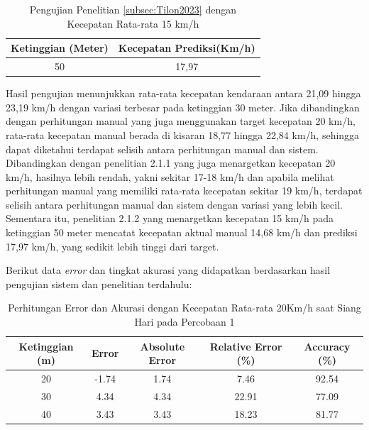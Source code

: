 \vspace{-10pt}
\begin{table}[H]
	\caption{Pengujian Penelitian \ref{subsec:Tilon2023} dengan Kecepatan Rata-rata 15 km/h}
    \label{table:15kmh-sistem-Tilon}
	\centering
	\begin{tabular}{|c|c|}
		\hline
		\textbf{Ketinggian (Meter)} & \textbf{Kecepatan Prediksi(Km/h)} \\ \hline
		50 & 17,97 \\ \hline
	\end{tabular}
\end{table}

Hasil pengujian menunjukkan rata-rata kecepatan kendaraan antara 21,09 hingga 23,19 km/h dengan variasi terbesar pada ketinggian 30 meter. Jika dibandingkan dengan perhitungan manual yang juga menggunakan target kecepatan 20 km/h, rata-rata kecepatan manual berada di kisaran 18,77 hingga 22,84 km/h, sehingga dapat diketahui terdapat selisih antara perhitungan manual dan sistem. Dibandingkan dengan penelitian 2.1.1 yang juga menargetkan kecepatan 20 km/h, hasilnya lebih rendah, yakni sekitar 17-18 km/h dan apabila melihat perhitungan manual yang memiliki rata-rata kecepatan sekitar 19 km/h, terdapat selisih antara perhitungan manual dan sistem dengan variasi yang lebih kecil. Sementara itu, penelitian 2.1.2 yang menargetkan kecepatan 15 km/h pada ketinggian 50 meter mencatat kecepatan aktual manual 14,68 km/h dan prediksi 17,97 km/h, yang sedikit lebih tinggi dari target.

Berikut data \emph{error} dan tingkat akurasi yang didapatkan berdasarkan hasil pengujian sistem dan penelitian terdahulu:

\begin{table}[H]
\centering
\caption{Perhitungan Error dan Akurasi dengan Kecepatan Rata-rata 20Km/h saat Siang Hari pada Percobaan 1}
\label{table:error_accuracy_titik1}
\begin{tabular}{|c|c|c|c|c|}
\hline
\textbf{Ketinggian (m)} & \textbf{Error} & \textbf{Absolute Error} & \textbf{Relative Error (\%)} & \textbf{Accuracy (\%)} \\ \hline
20 & -1.74 & 1.74 & 7.46 & 92.54 \\
30 & 4.34 & 4.34 & 22.91 & 77.09 \\
40 & 3.43 & 3.43 & 18.23 & 81.77 \\ \hline
\end{tabular}
\end{table}

